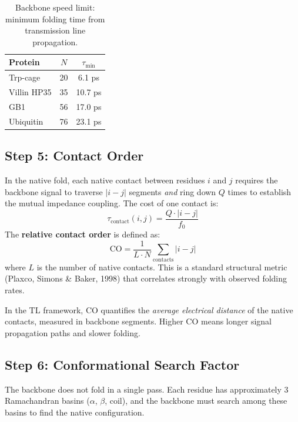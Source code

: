 \begin{table}[H]
\centering
\caption{Backbone speed limit: minimum folding time from transmission line propagation.}
\label{tab:speed_limit}
\small
\begin{tabular}{@{}l c c@{}}
\toprule
\textbf{Protein} & $N$ & $\tau_\text{min}$ \\
\midrule
Trp-cage  & 20 & 6.1 ps \\
Villin HP35 & 35 & 10.7 ps \\
GB1       & 56 & 17.0 ps \\
Ubiquitin & 76 & 23.1 ps \\
\bottomrule
\end{tabular}
\end{table}

\subsection{Step 5: Contact Order}
\label{sec:contact_order}

In the native fold, each native contact between residues $i$ and $j$ requires the backbone signal to traverse $|i-j|$ segments \emph{and} ring down $Q$ times to establish the mutual impedance coupling.
The cost of one contact is:
\begin{equation}
    \tau_\text{contact}(i,j) = \frac{Q \cdot |i-j|}{f_0}
    \label{eq:tau_contact}
\end{equation}
The \textbf{relative contact order} is defined as:
\begin{equation}
    \text{CO} = \frac{1}{L \cdot N} \sum_{\text{contacts}} |i - j|
    \label{eq:contact_order}
\end{equation}
where $L$ is the number of native contacts.  This is a standard structural metric (Plaxco, Simons \& Baker, 1998) that correlates strongly with observed folding rates.

In the TL framework, CO quantifies the \emph{average electrical distance} of the native contacts, measured in backbone segments.  Higher CO means longer signal propagation paths and slower folding.

\subsection{Step 6: Conformational Search Factor}
\label{sec:search_factor}

The backbone does not fold in a single pass.
Each residue has approximately 3 Ramachandran basins ($\alpha$, $\beta$, coil), and the backbone must search among these basins to find the native configuration.

